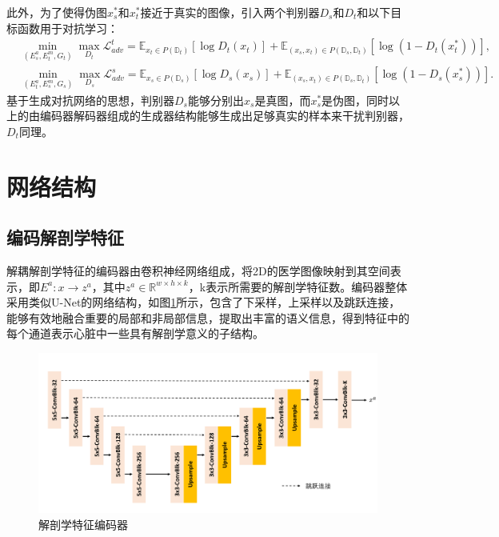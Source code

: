 此外，为了使得伪图$x_s^*$和$x_t^*$接近于真实的图像，引入两个判别器$D_s$和$D_t$和以下目标函数用于对抗学习：
\begin{align}
&\min_{(E_s^{a},E_t^{m},G_t)}\max_{D_t} \mathcal{L}_{adv}^t= \mathbb{E}_{x_t\in P(\mathbb{D}_t)}[\log D_t(x_t)] + \mathbb{E}_{(x_s,x_t)\in P(\mathbb{D}_s,\mathbb{D}_t)}[\log (1-D_t(x_t^*))],\\
&\min_{(E_t^{a},E_s^{m},G_s)}\max_{D_s} \mathcal{L}_{adv}^s= \mathbb{E}_{x_s\in P(\mathbb{D}_s)}[\log D_s(x_s)] + \mathbb{E}_{(x_s,x_t)\in P(\mathbb{D}_s,\mathbb{D}_t)}[\log (1-D_s(x_s^*))].
\end{align}
基于生成对抗网络的思想，判别器$D_s$能够分别出$x_s$是真图，而$x_s^*$是伪图，同时以上的由编码器解码器组成的生成器结构能够生成出足够真实的样本来干扰判别器，$D_t$同理。

\section{网络结构}
\subsection{编码解剖学特征}
解耦解剖学特征的编码器由卷积神经网络组成，将2D的医学图像映射到其空间表示，即$E^a:x\rightarrow z^a$，其中$z^a\in \mathbb{R}^{w\times h\times k}$，k表示所需要的解剖学特征数。编码器整体采用类似U-Net\cite{ronneberger2015u}的网络结构，如图\ref{fig:enc_anatomy}所示，包含了下采样，上采样以及跳跃连接，能够有效地融合重要的局部和非局部信息，提取出丰富的语义信息，得到特征中的每个通道表示心脏中一些具有解剖学意义的子结构。
\begin{figure}
    \centering
    \includegraphics[width=\textwidth]{image/chap03/encoder_anatomy.pdf}
    \caption{解剖学特征编码器}
    \label{fig:enc_anatomy}
\end{figure}
